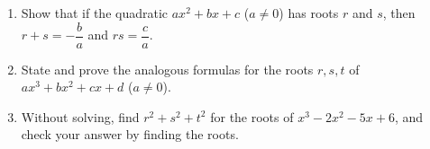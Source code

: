\begin{enumerate}
\item[(a)] Show that if the quadratic $ax^2+bx+c$ ($a\ne0$) has roots $r$ and $s$, then $r+s=-\dfrac ba$ and $rs=\dfrac ca$.
\item[(b)] State and prove the analogous formulas for the roots $r,s,t$ of $ax^3+bx^2+cx+d$ ($a\ne0$).
\item[(c)] Without solving, find $r^2+s^2+t^2$ for the roots of $x^3-2x^2-5x+6$, and check your answer by finding the roots.
\end{enumerate}
